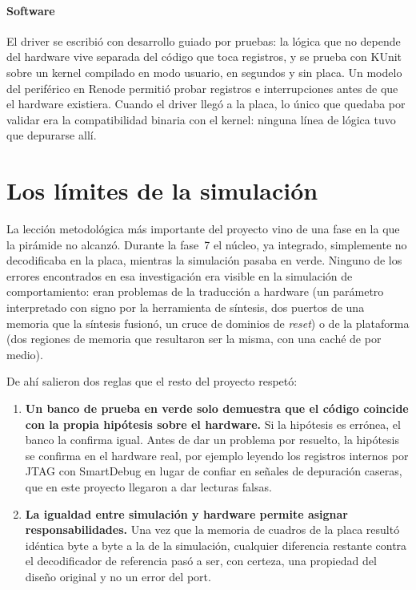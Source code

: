 \paragraph{Software}
El driver se escribió con desarrollo guiado por pruebas: la lógica que no
depende del hardware vive separada del código que toca registros, y se
prueba con KUnit sobre un kernel compilado en modo usuario, en segundos y
sin placa. Un modelo del periférico en Renode permitió probar registros e
interrupciones antes de que el hardware existiera. Cuando el driver llegó a
la placa, lo único que quedaba por validar era la compatibilidad binaria con
el kernel: ninguna línea de lógica tuvo que depurarse allí.

\section{Los límites de la simulación}
\label{sec:limites-simulacion}

La lección metodológica más importante del proyecto vino de una fase en la
que la pirámide no alcanzó. Durante la fase~7 el núcleo, ya integrado,
simplemente no decodificaba en la placa, mientras la simulación pasaba en
verde. Ninguno de los errores encontrados en esa investigación era visible
en la simulación de comportamiento: eran problemas de la traducción a
hardware (un parámetro interpretado con signo por la herramienta de
síntesis, dos puertos de una memoria que la síntesis fusionó, un cruce de
dominios de \emph{reset}) o de la plataforma (dos regiones de memoria que
resultaron ser la misma, con una caché de por medio).

De ahí salieron dos reglas que el resto del proyecto respetó:

\begin{enumerate}
  \item \textbf{Un banco de prueba en verde solo demuestra que el código
    coincide con la propia hipótesis sobre el hardware.} Si la hipótesis es
    errónea, el banco la confirma igual. Antes de dar un problema por
    resuelto, la hipótesis se confirma en el hardware real, por ejemplo
    leyendo los registros internos por JTAG con SmartDebug en lugar de
    confiar en señales de depuración caseras, que en este proyecto llegaron
    a dar lecturas falsas.
  \item \textbf{La igualdad entre simulación y hardware permite asignar
    responsabilidades.} Una vez que la memoria de cuadros de la placa resultó
    idéntica byte a byte a la de la simulación, cualquier diferencia
    restante contra el decodificador de referencia pasó a ser, con certeza,
    una propiedad del diseño original y no un error del port.
\end{enumerate}


